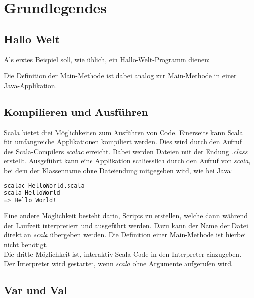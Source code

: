 \chapter{Grundlegendes}

\section{Hallo Welt}
\label{sec:helloWorld}

Als erstes Beispiel soll, wie üblich, ein Hallo-Welt-Programm dienen:



Die Definition der Main-Methode ist dabei analog zur Main-Methode in
einer Java-Applikation.


\section{Kompilieren und Ausführen}

Scala bietet drei Möglichkeiten zum Ausführen von Code. Einerseits kann Scala
für umfangreiche Applikationen kompiliert werden. Dies wird durch den
Aufruf des Scala-Compilers \emph{scalac} erreicht. Dabei werden Dateien
mit der Endung \emph{.class} erstellt. Ausgeführt kann eine Applikation
schliesslich durch den Aufruf von \emph{scala}, bei dem der Klassenname 
ohne Dateiendung mitgegeben wird, wie bei Java:

\begin{lstlisting}[float=ht,language=bash,caption=Kompilieren und ausführen von Scala-Code,label=lst:execute]
scalac HelloWorld.scala
scala HelloWorld
=> Hello World!
\end{lstlisting}

Eine andere Möglichkeit besteht darin, Scripts zu erstellen, welche dann
während der Laufzeit interpretiert und ausgeführt werden. Dazu kann
der Name der Datei direkt an \emph{scala} übergeben werden. Die Definition
einer Main-Methode ist hierbei nicht benötigt.\\

Die dritte Möglichkeit ist, interaktiv Scala-Code in den Interpreter 
einzugeben. Der Interpreter wird gestartet, wenn \emph{scala} ohne
Argumente aufgerufen wird.

\section{Var und Val}

